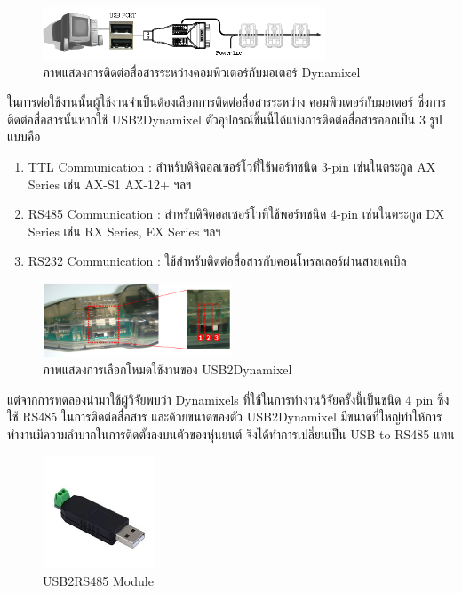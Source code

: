 \begin{figure}[!ht]
    \centering
    \includegraphics[width=0.75\textwidth]{chapter3/images/dynamixel2pc.png}
    \caption{ภาพแสดงการติดต่อสื่อสารระหว่างคอมพิวเตอร์กับมอเตอร์ Dynamixel}
    \label{fig:dynamixel2pc}
\end{figure}

ในการต่อใช้งานนั้นผู้ใช้งานจำเป็นต้องเลือกการติดต่อสื่อสารระหว่าง คอมพิวเตอร์กับมอเตอร์
ซึ่งการติดต่อสื่อสารนั้นหากใช้ USB2Dynamixel ตัวอุปกรณ์ชิ้นนี้ได้แบ่งการติดต่อสื่อสารออกเป็น 3 รูปแบบคือ
\vspace{-10pt}
\begin{enumerate}[label=\arabic*, leftmargin=1.5cm]
    \setlength\itemsep{-0.25em}
    \item TTL Communication : สำหรับดิจิตอลเซอร์โวที่ใช้พอร์ทชนิด 3-pin เช่นในตระกูล AX Series เช่น AX-S1 AX-12+ ฯลฯ
    \item RS485 Communication : สำหรับดิจิตอลเซอร์โวที่ใช้พอร์ทชนิด 4-pin เช่นในตระกูล DX Series เช่น RX Series, EX Series ฯลฯ
    \item RS232 Communication : ใช้สำหรับติดต่อสื่อสารกับคอนโทรลเลอร์ผ่านสายเคเบิล
\end{enumerate}
\vspace{-15pt}
\begin{figure}[!ht]
    \centering
    \includegraphics[width=0.5\textwidth]{chapter3/images/useusb2dynamixel.png}
    \caption{ภาพแสดงการเลือกโหมดใช้งานของ USB2Dynamixel}
    \label{fig:useusb2dynamixel}
\end{figure}

แต่จากการทดลองนำมาใช้ผู้วิจัยพบว่า Dynamixels ที่ใช้ในการทำงานวิจัยครั้งนี้เป็นชนิด 4 pin ซึ่งใช้ RS485 ในการติดต่อสื่อสาร
และด้วยขนาดของตัว USB2Dynamixel มีขนาดที่ใหญ่ทำให้การทำงานมีความลำบากในการติดตั้งลงบนตัวของหุ่นยนต์
จึงได้ทำการเปลี่ยนเป็น USB to RS485 แทน
\begin{figure}[!ht]
    \centering
    \includegraphics[width=0.3\textwidth]{chapter3/images/usb2rs485.jpg}
    \caption{USB2RS485 Module}
    \label{fig:usb2rs485}
\end{figure}

